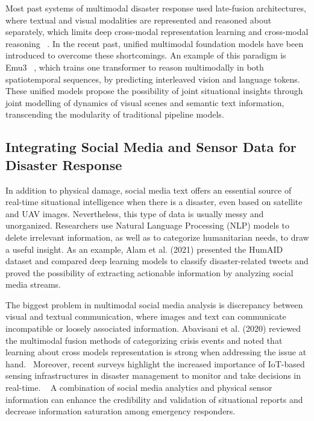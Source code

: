 \documentclass[conference]{IEEEtran}
\begin{document}
Most past systems of multimodal disaster response used late-fusion architectures, where textual and visual modalities are represented and reasoned about separately, which limits deep cross-modal representation learning and cross-modal reasoning ~\cite{b16}. In the recent past, unified multimodal foundation models have been introduced to overcome these shortcomings. An example of this paradigm is Emu3 ~\cite{b17}, which trains one transformer to reason multimodally in both spatiotemporal sequences, by predicting interleaved vision and language tokens. These unified models propose the possibility of joint situational insights through joint modelling of dynamics of visual scenes and semantic text information, transcending the modularity of traditional pipeline models.

\subsection{Integrating Social Media and Sensor Data for Disaster Response}

In addition to physical damage, social media text offers an essential source of real-time situational intelligence when there is a disaster, even based on satellite and UAV images. Nevertheless, this type of data is usually messy and unorganized. Researchers use Natural Language Processing (NLP) models to delete irrelevant information, as well as to categorize humanitarian needs, to draw a useful insight. As an example, Alam et al. (2021) presented the HumAID dataset and compared deep learning models to classify disaster-related tweets and proved the possibility of extracting actionable information by analyzing social media streams.~\cite{b18} 


The biggest problem in multimodal social media analysis is discrepancy between visual and textual communication, where images and text can communicate incompatible or loosely associated information. Abavisani et al. (2020) reviewed the multimodal fusion methods of categorizing crisis events and noted that learning about cross models representation is strong when addressing the issue at hand.~\cite{b19} Moreover, recent surveys highlight the increased importance of IoT-based sensing infrastructures in disaster management to monitor and take decisions in real-time. ~\cite{b20} A combination of social media analytics and physical sensor information can enhance the credibility and validation of situational reports and decrease information saturation among emergency responders.
\end{document}
